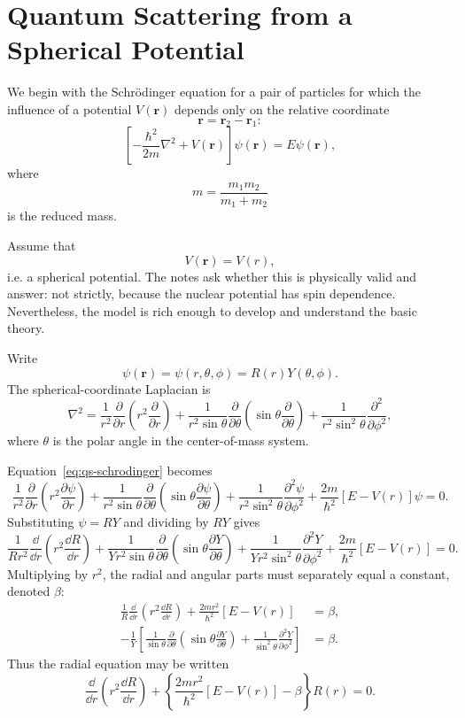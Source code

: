 \chapter{Quantum Scattering from a Spherical Potential}
\label{lec:quantum_scattering}

We begin with the Schr\"odinger equation for a pair of particles for which the influence of a potential $V(\bm r)$ depends only on the relative coordinate
\[
  \bm r=\bm r_2-\bm r_1:
\]
\begin{equation}
  \left[-\frac{\hbar^2}{2m}\nabla^2+V(\bm r)\right]\psi(\bm r)=E\psi(\bm r),
  \label{eq:qs-schrodinger}
\end{equation}
where
\[
  m=\frac{m_1m_2}{m_1+m_2}
\]
is the reduced mass.

Assume that
\[
  V(\bm r)=V(r),
\]
i.e. a spherical potential.  The notes ask whether this is physically valid and answer: not strictly, because the nuclear potential has spin dependence.  Nevertheless, the model is rich enough to develop and understand the basic theory.

Write
\[
  \psi(\bm r)=\psi(r,\theta,\phi)=R(r)Y(\theta,\phi).
\]
The spherical-coordinate Laplacian is
\[
  \nabla^2=
  \frac{1}{r^2}\frac{\partial}{\partial r}
  \left(r^2\frac{\partial}{\partial r}\right)
  +\frac{1}{r^2\sin\theta}\frac{\partial}{\partial\theta}
  \left(\sin\theta\frac{\partial}{\partial\theta}\right)
  +\frac{1}{r^2\sin^2\theta}\frac{\partial^2}{\partial\phi^2},
\]
where $\theta$ is the polar angle in the center-of-mass system.

Equation~\eqref{eq:qs-schrodinger} becomes
\[
  \frac{1}{r^2}\frac{\partial}{\partial r}
  \left(r^2\frac{\partial\psi}{\partial r}\right)
  +\frac{1}{r^2\sin\theta}\frac{\partial}{\partial\theta}
  \left(\sin\theta\frac{\partial\psi}{\partial\theta}\right)
  +\frac{1}{r^2\sin^2\theta}\frac{\partial^2\psi}{\partial\phi^2}
  +\frac{2m}{\hbar^2}[E-V(r)]\psi=0.
\]
Substituting $\psi=RY$ and dividing by $RY$ gives
\[
  \frac{1}{Rr^2}\frac{\dd}{\dd r}
  \left(r^2\frac{\dd R}{\dd r}\right)
  +\frac{1}{Yr^2\sin\theta}\frac{\partial}{\partial\theta}
  \left(\sin\theta\frac{\partial Y}{\partial\theta}\right)
  +\frac{1}{Yr^2\sin^2\theta}\frac{\partial^2Y}{\partial\phi^2}
  +\frac{2m}{\hbar^2}[E-V(r)]=0.
\]
Multiplying by $r^2$, the radial and angular parts must separately equal a constant, denoted $\beta$:
\begin{align*}
  \frac{1}{R}\frac{\dd}{\dd r}\left(r^2\frac{\dd R}{\dd r}\right)
  +\frac{2mr^2}{\hbar^2}[E-V(r)]
  &=\beta,\\
  -\frac{1}{Y}\left[
  \frac{1}{\sin\theta}\frac{\partial}{\partial\theta}
  \left(\sin\theta\frac{\partial Y}{\partial\theta}\right)
  +\frac{1}{\sin^2\theta}\frac{\partial^2Y}{\partial\phi^2}
  \right]
  &=\beta.
\end{align*}
Thus the radial equation may be written
\begin{equation}
  \frac{\dd}{\dd r}\left(r^2\frac{\dd R}{\dd r}\right)
  +\left\{\frac{2mr^2}{\hbar^2}[E-V(r)]-\beta\right\}R(r)=0.
  \label{eq:qs-radial-beta}
\end{equation}

